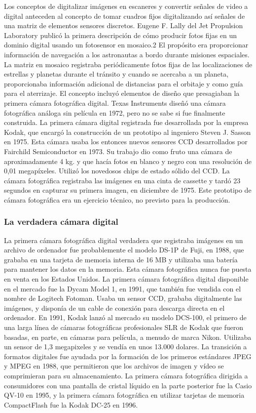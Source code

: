\documentclass[12pt,a4papert,woside,openright,titlepage,final]{book}
\begin{document}
Los conceptos de digitalizar imágenes en escaneres y convertir señales de video
a digital anteceden al concepto de tomar cuadros fijos digitalizando así señales
de una matriz de elementos sensores discretos. Eugene F. Lally del Jet
Propulsion Laboratory publicó la primera descripción de cómo producir fotos
fijas en un dominio digital usando un fotosensor en mosaico.2 El propósito era
proporcionar información de navegación a los astronautas a bordo durante
misiones espaciales. La matriz en mosaico registraba periódicamente fotos fijas
de las localizaciones de estrellas y planetas durante el tránsito y cuando se
acercaba a un planeta, proporcionaba información adicional de distancias para el
orbitaje y como guía para el aterrizaje. El concepto incluyó elementos de diseño
que presagiaban la primera cámara fotográfica digital.
Texas Instruments diseñó una cámara fotográfica análoga sin película en 1972,
pero no se sabe si fue finalmente construida. La primera cámara digital
registrada fue desarrollada por la empresa Kodak, que encargó la construcción de
un prototipo al ingeniero Steven J. Sasson en 1975. Esta cámara usaba los
entonces nuevos sensores CCD desarrollados por Fairchild Semiconductor en 1973.
Su trabajo dio como fruto una cámara de aproximadamente 4 kg. y que hacía fotos
en blanco y negro con una resolución de 0,01 megapíxeles. Utilizó los novedosos
chips de estado sólido del CCD. La cámara fotográfica registraba las imágenes en
una cinta de cassette y tardó 23 segundos en capturar su primera imagen, en
diciembre de 1975. Este prototipo de cámara fotográfica era un ejercicio
técnico, no previsto para la producción.
\subsubsection{La verdadera cámara digital }
La primera cámara fotográfica digital verdadera que registraba imágenes en un
archivo de ordenador fue probablemente el modelo DS-1P de Fuji, en 1988, que
grababa en una tarjeta de memoria interna de 16 MB y utilizaba una batería para
mantener los datos en la memoria. Esta cámara fotográfica nunca fue puesta en
venta en los Estados Unidos. La primera cámara fotográfica digital disponible en
el mercado fue la Dycam Model 1, en 1991, que también fue vendida con el nombre
de Logitech Fotoman. Usaba un sensor CCD, grababa digitalmente las imágenes, y
disponía de un cable de conexión para descarga directa en el ordenador.
En 1991, Kodak lanzó al mercado su modelo DCS-100, el primero de una larga línea
de cámaras fotográficas profesionales SLR de Kodak que fueron basadas, en parte,
en cámaras para película, a menudo de marca Nikon. Utilizaba un sensor de 1,3
megapixeles y se vendía en unos 13.000 dolares.
La transición a formatos digitales fue ayudada por la formación de los primeros
estándares JPEG y MPEG en 1988, que permitieron que los archivos de imagen y
vídeo se comprimieran para su almacenamiento. La primera cámara fotográfica
dirigida a consumidores con una pantalla de cristal líquido en la parte
posterior fue la Casio QV-10 en 1995, y la primera cámara fotográfica en
utilizar tarjetas de memoria CompactFlash fue la Kodak DC-25 en 1996.
\end{document}
